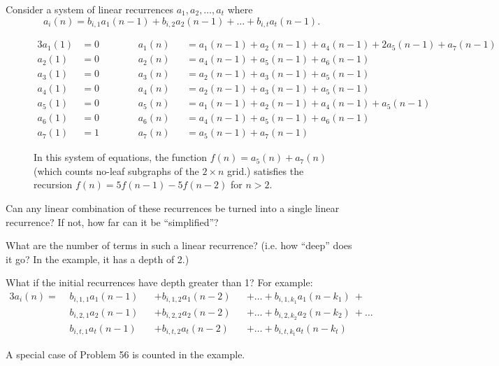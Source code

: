 \documentclass{article}
\begin{document}

Consider a system of linear recurrences $a_1, a_2, \hdots, a_t$ where \[
  a_i(n) = b_{i,1}a_1(n - 1) + b_{i,2}a_2(n - 1) + \hdots + b_{i,t}a_t(n - 1).
\]

\begin{figure}[ht!]
  \centering
  \begin{alignat*}{3}
    a_1(1) &= 0 \hspace{1cm} && a_1(n) &&= a_1(n - 1) + a_2(n - 1) + a_4(n - 1) + 2a_5(n - 1) + a_7(n - 1) \\
    a_2(1) &= 0 \hspace{1cm} && a_2(n) &&= a_4(n - 1) + a_5(n - 1) + a_6(n - 1) \\
    a_3(1) &= 0 \hspace{1cm} && a_3(n) &&= a_2(n - 1) + a_3(n - 1) + a_5(n - 1) \\
    a_4(1) &= 0 \hspace{1cm} && a_4(n) &&= a_2(n - 1) + a_3(n - 1) + a_5(n - 1) \\
    a_5(1) &= 0 \hspace{1cm} && a_5(n) &&= a_1(n - 1) + a_2(n - 1) + a_4(n - 1) + a_5(n - 1) \\
    a_6(1) &= 0 \hspace{1cm} && a_6(n) &&= a_4(n - 1) + a_5(n - 1) + a_6(n - 1) \\
    a_7(1) &= 1 \hspace{1cm} && a_7(n) &&= a_5(n - 1) + a_7(n - 1)
  \end{alignat*}
  \caption{
    In this system of equations, the function $f(n) = a_5(n) + a_7(n)$
    (which counts no-leaf subgraphs of the $2 \times n$ grid.)
    satisfies the recursion $f(n) = 5f(n-1) - 5f(n-2)$ for $n > 2$.
  }
\end{figure}
\begin{question}
  Can any linear combination of these recurrences
  be turned into a single linear recurrence? If not, how far can it be
  ``simplified''?
\end{question}

\begin{related}
  \item What are the number of terms in such a linear recurrence?
  (i.e. how ``deep'' does it go? In the example, it has a depth of 2.)
  \item What if the initial recurrences have depth greater than 1?
  For example:
  \begin{alignat*}{3}
    a_i(n) = \,\,
    & b_{i,1,1}a_1(n - 1) &&+ b_{i,1,2}a_1(n - 2) &&+ \hdots + b_{i,1,k_1}a_1(n - k_1)\ + \\
    & b_{i,2,1}a_2(n - 1) &&+ b_{i,2,2}a_2(n - 2) &&+ \hdots + b_{i,2,k_2}a_2(n - k_2)\ + \hdots \\
    & b_{i,t,1}a_t(n - 1) &&+ b_{i,t,2}a_t(n - 2) &&+ \hdots + b_{i,t,k_t}a_t(n - k_t)
  \end{alignat*}
\end{related}

\begin{references}
  \item A special case of Problem 56 is counted in the example.
\end{references}
\end{document}

